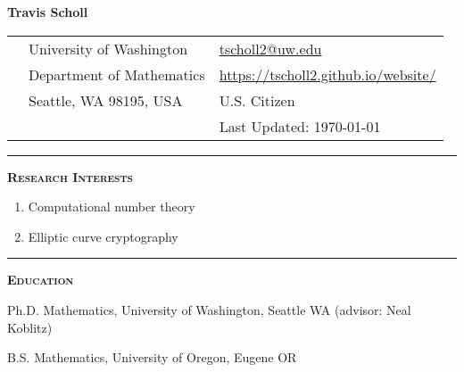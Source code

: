 \documentclass[12pt]{article}
\newcommand{\sectionheading}[1]
{
\bigskip %
\noindent
\hspace{-6.5mm}\textcolor{Gray}{\rule[.75mm]{21.5mm}{1mm}} %
\hspace{.2mm}	%
{\large{\textbf{\textsc{#1}}}} %
}
\newenvironment{date_section}
	{
	\vspace{-1ex}
	\leftmargini = 15ex
		\begin{itemize}[
			labelsep = *,
			labelwidth = 9ex,
			labelindent = 0ex,
			itemindent = !,
			font=\normalfont,
			align=parleft
		]{}
		\itemsep=-1.5mm
	}
	{\end{itemize}\vspace{-2ex}}
\newcommand{\yearmo}[2]{
	\item[
		{\makebox[1ex][r]{#1}}
		\hspace{1ex}
		{\makebox[1ex][l]{#2} }
		] }
\newcommand{\yearrange}[2]{
	\item[
		{\makebox[1ex][r]{#1}}
		--
		{\makebox[1ex][l]{#2} }
		] }
\begin{document}

	\thispagestyle{empty}

	\centerline{{\LARGE \textbf{Travis Scholl}}}

	\vspace{3mm}

	\begin{center}
		\begin{tabular}[c]{lll} %
			\phantom{aaaaaaaaa} %
			& University of Washington
				& \url{tscholl2@uw.edu} \\
 			& Department of Mathematics
				& \url{https://tscholl2.github.io/website/}\\
 			& Seattle, WA 98195, USA
	 			& U.S. Citizen \\
			&
				& Last Updated: \today
		\end{tabular}
	\end{center}

	\sectionheading{Research Interests}%
	
	\vspace{1ex}
	
	\begin{enumerate}[label=$\bullet$]
		\item Computational number theory
		\item Elliptic curve cryptography
	\end{enumerate}

	\sectionheading{Education}%

		\begin{date_section}

			\yearmo{Expected}{2018} %
			Ph.D. Mathematics, University of Washington, Seattle WA (advisor: Neal Koblitz)

			\yearmo{}{2013} %
			B.S. Mathematics, University of Oregon, Eugene OR





		\end{date_section}
\end{document}
